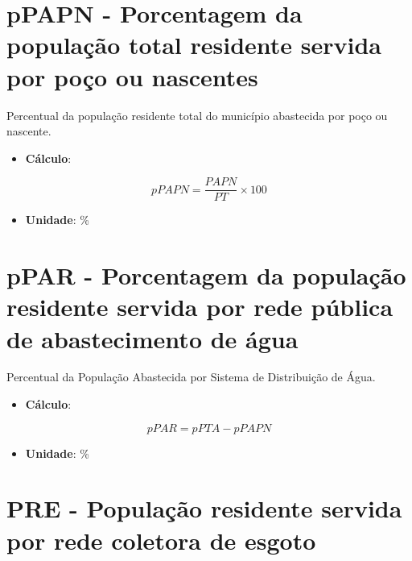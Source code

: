 \documentclass[]{book}
\providecommand{\tightlist}{%
  \setlength{\itemsep}{0pt}\setlength{\parskip}{0pt}}
\begin{document}
\hypertarget{ppapn---porcentagem-da-populauxe7uxe3o-total-residente-servida-por-pouxe7o-ou-nascentes}{%
\section*{pPAPN - Porcentagem da população total residente servida por poço ou nascentes}\label{ppapn---porcentagem-da-populauxe7uxe3o-total-residente-servida-por-pouxe7o-ou-nascentes}}

Percentual da população residente total do município abastecida por poço ou nascente.

\begin{itemize}
\tightlist
\item
  \textbf{Cálculo}:
\end{itemize}

\[
pPAPN =\frac{PAPN}{PT} \times 100
\]

\begin{itemize}
\tightlist
\item
  \textbf{Unidade}: \%
\end{itemize}

\hypertarget{ppar---porcentagem-da-populauxe7uxe3o-residente-servida-por-rede-puxfablica-de-abastecimento-de-uxe1gua}{%
\section*{pPAR - Porcentagem da população residente servida por rede pública de abastecimento de água}\label{ppar---porcentagem-da-populauxe7uxe3o-residente-servida-por-rede-puxfablica-de-abastecimento-de-uxe1gua}}

Percentual da População Abastecida por Sistema de Distribuição de Água.

\begin{itemize}
\tightlist
\item
  \textbf{Cálculo}:
\end{itemize}

\[
pPAR = pPTA - pPAPN
\]

\begin{itemize}
\tightlist
\item
  \textbf{Unidade}: \%
\end{itemize}

\hypertarget{pre---populauxe7uxe3o-residente-servida-por-rede-coletora-de-esgoto}{%
\section*{PRE - População residente servida por rede coletora de esgoto}\label{pre---populauxe7uxe3o-residente-servida-por-rede-coletora-de-esgoto}}
\end{document}
